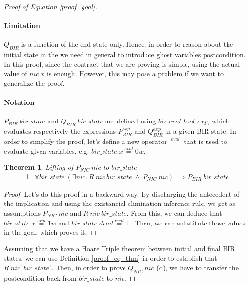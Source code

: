\documentclass{kththesis}
\newcommand{\eqeval}{\stackrel{eval}{=}}
\newtheorem{theorem}{Theorem}[section]
\begin{document}
\begin{proof}[Proof of Equation \ref{proof_goal}]
\paragraph{Limitation} $Q_{BIR}$ is a function of the end state only. Hence, in order to reason about the initial state in the we need in general to introduce ghost variables postcondition. In this proof, since the contract that we are proving is simple, using the actual value of $nic.x$ is enough. However, this may pose a problem if we want to generalize the proof.

\paragraph{Notation} $P_{BIR}~bir\_state$ and $Q_{BIR}~bir\_state$ are defined using $bir\_eval\_bool\_exp$, which evaluates respectively the expressions $P^{exp}_{BIR}$ and $Q^{exp}_{BIR}$ in a given BIR state. In order to simplify the proof, let's define a new operator $\eqeval$ that is used to evaluate given variables, e.g. $bir\_state.x \eqeval 0w$.
\bigskip

\begin{theorem} \label{proof_b_thm}
Lifting of $P_{NIC}~nic$ to $bir\_state$
\begin{equation*} \label{proof_b_thm_eq}
\begin{split}
\vdash~\forall bir\_state~(\exists nic.~R~nic~bir\_state~\land~P_{NIC}~nic) \implies P_{BIR}~bir\_state
\end{split}
\end{equation*}
\end{theorem}

\begin{proof}
Let's do this proof in a backward way. By discharging the antecedent of the implication and using the existancial elimination inference rule, we get as assumptions $P_{NIC}~nic$ and $R~nic~bir\_state$. From this, we can deduce that $bir\_state.x \eqeval 1w$ and $bir\_state.dead \eqeval \bot$. Then, we can substitute those values in the goal, which proves it.
\end{proof}

Assuming that we have a Hoare Triple theorem between initial and final BIR states, we can use Definition \ref{proof_eq_thm} in order to establish that $R~nic'~bir\_state'$. Then, in order to prove $Q_{NIC}~nic$ (d), we have to transfer the postcondition back from $bir\_state$ to $nic$.


\end{proof}
\end{document}
